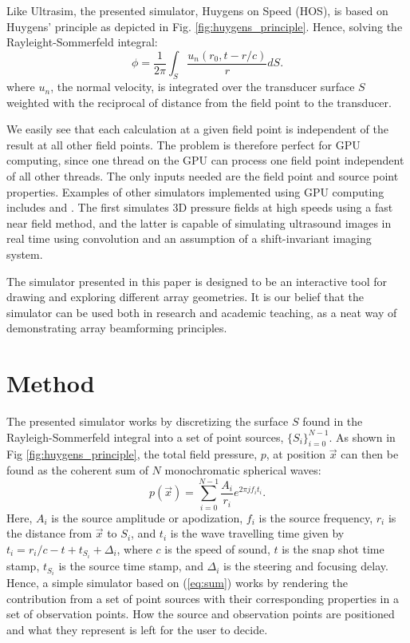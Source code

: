 Like Ultrasim, the presented simulator, Huygens on Speed (HOS), is based on Huygens' principle \cite{huygens} as depicted in Fig. \ref{fig:huygens_principle}. Hence, solving the Rayleight-Sommerfeld integral\cite{Holm2001}:
\begin{equation}
\phi = \frac{1}{2\pi} \int_S \frac{u_n(r_0, t-r/c)}{r}dS.
\end{equation}
where $u_n$, the normal velocity, is integrated over the transducer surface $S$ weighted with the reciprocal of distance from the field point to the transducer.

We easily see that each calculation at a given field point is independent of the result at all other field points. The problem is therefore perfect for GPU computing, since one thread on the GPU can process one field point independent of all other threads. The only inputs needed are the field point and source point properties. Examples of other simulators implemented using GPU computing includes \cite{Hlawitschka2010} and \cite{Gjerald2012}. The first simulates 3D pressure fields at high speeds using a fast near field method, and the latter is capable of simulating ultrasound images in real time using convolution and an assumption of a shift-invariant imaging system.

The simulator presented in this paper is designed to be an interactive tool for drawing and exploring different array geometries.  It is our belief that the simulator can be used both in research and academic teaching, as a neat way of demonstrating array beamforming principles.


\section{Method}\label{sec:method}

The presented simulator works by discretizing the surface $S$ found in the Rayleigh-Sommerfeld integral into a set of point sources, $\{S_i\}_{i=0}^{N-1}$. As shown in Fig \ref{fig:huygens_principle}, the total field pressure, $p$, at position $\vec{x}$ can then be found as the coherent sum of $N$ monochromatic spherical waves:
\begin{equation}\label{eq:sum}
p(\vec{x}) = \sum_{i=0}^{N-1} \frac{A_i}{r_i}e^{2 \pi j f_i t_i}.
\end{equation}
Here, $A_i$ is the source amplitude or apodization, $f_i$ is the source frequency, $r_i$ is the distance from $\vec{x}$ to $S_i$, and $t_i$ is the wave travelling time given by $t_i = r_i/c - t + t_{S_i} + \Delta_i$, where $c$ is the speed of sound, $t$ is the snap shot time stamp, $t_{S_i}$ is the source time stamp, and $\Delta_i$ is the steering and focusing delay. Hence, a simple simulator based on (\ref{eq:sum}) works by rendering the contribution from a set of point sources with their corresponding properties in a set of observation points. How the source and observation points are positioned and what they represent is left for the user to decide. 

